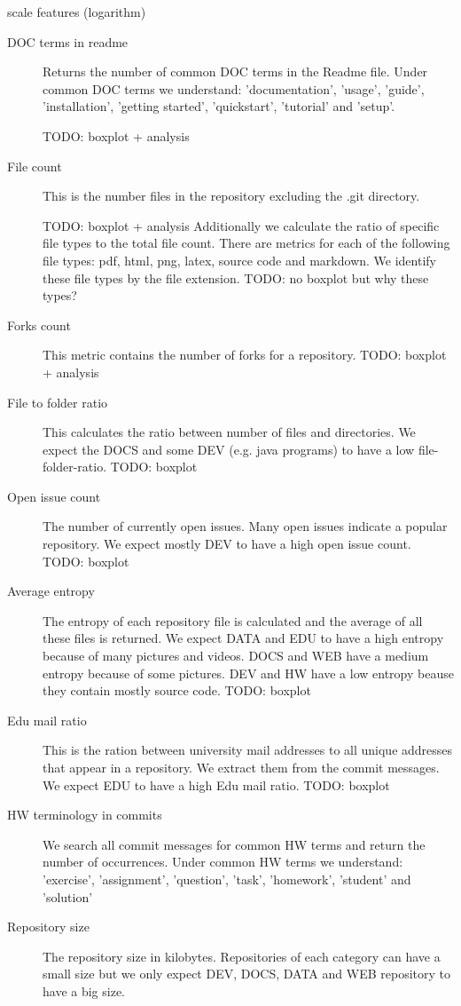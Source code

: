 \documentclass[a4paper]{scrartcl}
\begin{document}
scale features (logarithm)
\begin{description}
	
	\item[DOC terms in readme]
	Returns the number of common DOC terms in the Readme file. Under common DOC terms we understand: 'documentation', 'usage', 'guide', 'installation', 'getting started', 'quickstart', 'tutorial' and 'setup'.
	
	TODO: boxplot + analysis
	\item[File count]
	This is the number files in the repository excluding the .git directory.
	
	TODO: boxplot + analysis
	Additionally we calculate the ratio of specific file types to the total file count. There are metrics for each of the following file types: pdf, html, png, latex, source code and markdown. We identify these file types by the file extension.
	TODO: no boxplot but why these types?
	\item[Forks count]
	This metric contains the number of forks for a repository.
	TODO: boxplot + analysis
	\item[File to folder ratio]
	This calculates the ratio between number of files and directories. We expect the DOCS and some DEV (e.g. java programs) to have a low file-folder-ratio.
	TODO: boxplot
	\item[Open issue count]
	The number of currently open issues. Many open issues indicate a popular repository. We expect mostly DEV to have a high open issue count.
	TODO: boxplot
	\item[Average entropy]
	The entropy of each repository file is calculated and the average of all these files is returned. We expect DATA and EDU to have a high entropy because of many pictures and videos. DOCS and WEB have a medium entropy because of some pictures. DEV and HW have a low entropy beause they contain mostly source code.
	TODO: boxplot
	\item[Edu mail ratio]
	This is the ration between university mail addresses to all unique addresses that appear in a repository. We extract them from the commit messages. We expect EDU to have a high Edu mail ratio.
	TODO: boxplot 
	\item[HW terminology in commits]
	We search all commit messages for common HW terms and return the number of occurrences. Under common HW terms we understand: 'exercise', 'assignment', 'question', 'task', 'homework', 'student' and 'solution' 
	\item[Repository size]
	The repository size in kilobytes. Repositories of each category can have a small size but we only expect DEV, DOCS, DATA and WEB repository to have a big size.

\end{description}
\end{document}

